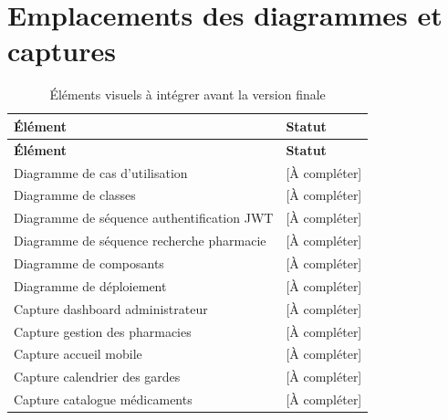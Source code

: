 \section{Emplacements des diagrammes et captures}

\begin{longtable}{L{5cm}L{9cm}}
    \caption{Éléments visuels à intégrer avant la version finale}\\
    \toprule
    \textbf{Élément} & \textbf{Statut} \\
    \midrule
    \endfirsthead
    \toprule
    \textbf{Élément} & \textbf{Statut} \\
    \midrule
    \endhead
    Diagramme de cas d'utilisation & [À compléter] \\
    Diagramme de classes & [À compléter] \\
    Diagramme de séquence authentification JWT & [À compléter] \\
    Diagramme de séquence recherche pharmacie & [À compléter] \\
    Diagramme de composants & [À compléter] \\
    Diagramme de déploiement & [À compléter] \\
    Capture dashboard administrateur & [À compléter] \\
    Capture gestion des pharmacies & [À compléter] \\
    Capture accueil mobile & [À compléter] \\
    Capture calendrier des gardes & [À compléter] \\
    Capture catalogue médicaments & [À compléter] \\
    \bottomrule
\end{longtable}
